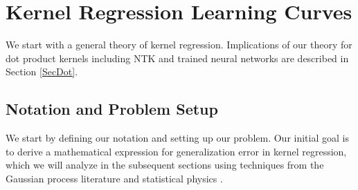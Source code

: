 \documentclass{article}
\newcommand{\cp}[1]{{\color{red} #1}}
\begin{document}






\section{Kernel Regression Learning Curves}

We start with a general theory of kernel regression. Implications of our theory for dot product kernels including NTK and trained neural networks are described in Section \ref{SecDot}.

\subsection{Notation and Problem Setup}

We start by defining our notation and setting up our problem. Our initial goal is to derive a mathematical expression for generalization error in kernel regression, which we will analyze in the subsequent sections using techniques from the Gaussian process literature \cite{sollich1999learning,sollich2001mismatch,sollich2002approx} and statistical physics \cite{sherrington_spinglass,mezard1987spin}. 
\end{document}
